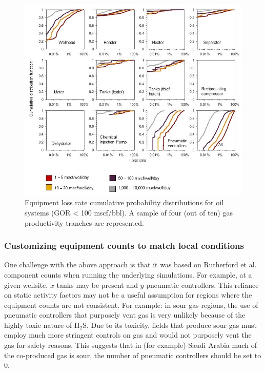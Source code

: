 \documentclass[11pt]{report}
\begin{document}
 \begin{figure}[t]
\includegraphics[width=1\columnwidth]{images/VF_dists_oil.jpg}
\caption{Equipment loss rate cumulative probability distributions for oil systems (GOR < 100 mscf/bbl). A sample of four (out of ten) gas productivity tranches are represented.}
\label{fig:VF_dists_oil}
\end{figure}  


\subsubsection{Customizing equipment counts to match local conditions}

One challenge with the above approach is that it was based on Rutherford et al. component counts when running the underlying simulations. For example, at a given wellsite, $x$ tanks may be present and $y$ pneumatic controllers. This reliance on static activity factors may not be a useful assumption for regions where the equipment counts are not consistent. For example: in sour gas regions, the use of pneumatic controllers that purposely vent gas is very unlikely because of the highly toxic nature of H$_2$S. Due to its toxicity, fields that produce sour gas must employ much more stringent controls on gas and would not purposely vent the gas for safety reasons. This suggests that in (for example) Saudi Arabia much of the co-produced gas is sour, the number of pneumatic controllers should be set to 0.
\end{document}
